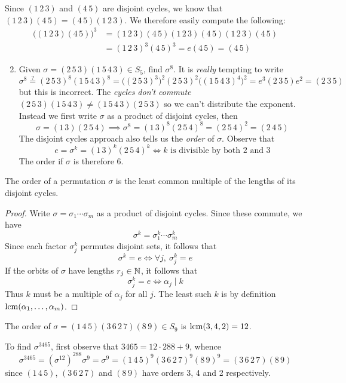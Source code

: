 \begin{examples}{}{}
\exstart Since $(1\,2\,3)$ and $(4\,5)$ are disjoint cycles, we know that $(1\,2\,3)(4\,5)=(4\,5)(1\,2\,3)$. We therefore easily compute the following:
	\begin{align*}
		\bigl((1\,2\,3)(4\,5)\bigr)^3&=(1\,2\,3)(4\,5)(1\,2\,3)(4\,5)(1\,2\,3)(4\,5)\\
		&=(1\,2\,3)^3(4\,5)^3 =e(4\,5)=(4\,5)
	\end{align*}
\begin{enumerate}\setcounter{enumi}{1}
	\item Given $\sigma=(2\,5\,3)(1\,5\,4\,3)\in S_5$, find $\sigma^{8}$. It is \emph{really} tempting to write
	\[\sigma^{8}\overset{\text{?}}{=}(2\,5\,3)^{8}(1\,5\,4\,3)^{8} =\bigl((2\,5\,3)^3\bigr)^2(2\,5\,3)^2\bigl((1\,5\,4\,3)^4\bigr)^2 =e^3(2\,3\,5)e^2  =(2\,3\,5)\]
	but this is incorrect. The \emph{cycles don't commute} $(2\,5\,3)(1\,5\,4\,3)\neq (1\,5\,4\,3)(2\,5\,3)$ so we can't distribute the exponent. Instead we first write $\sigma$ as a product of disjoint cycles, then
	\[\sigma=(1\,3)(2\,5\,4)\implies \sigma^8=(1\,3)^8(2\,5\,4)^8=(2\,5\,4)^2 =(2\,4\,5)\]
	The disjoint cycles approach also tells us the \emph{order} of $\sigma$. Observe that
	\[e=\sigma^k=(1\,3)^k(2\,5\,4)^k\iff k\text{ is divisible by both 2 and 3}\]
	The order if $\sigma$ is therefore 6.
\end{enumerate}
\end{examples}

\begin{cor}{}{}
The order of a permutation $\sigma$ is the least common multiple of the lengths of its disjoint cycles.
\end{cor}

\begin{proof}
Write $\sigma=\sigma_1\cdots\sigma_m$ as a product of disjoint cycles. Since these commute, we have
\[\sigma^k=\sigma_1^k\cdots\sigma_m^k\]
Since each factor $\sigma_j^k$ permutes disjoint sets, it follows that
\[\sigma^k=e\iff\forall j,\ \sigma_j^k=e\]
If the orbits of $\sigma$ have lengths $r_j\in\mathbb{N}$, it follows that
\[\sigma_j^k=e\iff \alpha_j\mid k\] 
Thus $k$ must be a multiple of $\alpha_j$ for all $j$. The least such $k$ is by definition $\operatorname{lcm}(\alpha_1,\ldots,\alpha_m)$.
\end{proof}

\begin{example}{}{}
The order of $\sigma=(1\,4\,5)(3\,6\,2\,7)(8\,9)\in S_9$ is $\operatorname{lcm}(3,4,2)=12$.\par
To find $\sigma^{3465}$, first observe that $3465=12\cdot 288+9$, whence
\[\sigma^{3465}=(\sigma^{12})^{288}\sigma^9=\sigma^9=(1\,4\,5)^9(3\,6\,2\,7)^9(8\,9)^9=(3\,6\,2\,7)(8\,9)\]
since $(1\,4\,5)$, $(3\,6\,2\,7)$ and $(8\,9)$ have orders 3, 4 and 2 respectively.
\end{example}


